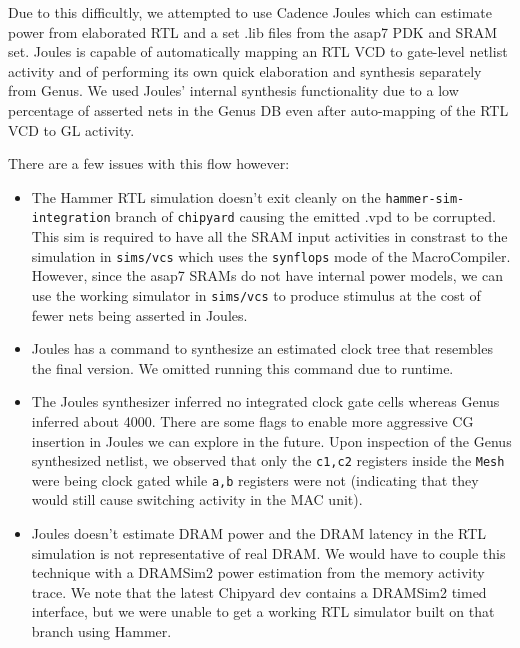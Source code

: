 \documentclass[sigconf]{acmart}
\begin{document}
Due to this difficultly, we attempted to use Cadence Joules which can estimate power from elaborated RTL and a set .lib files from the asap7 PDK and SRAM set.
Joules is capable of automatically mapping an RTL VCD to gate-level netlist activity and of performing its own quick elaboration and synthesis separately from Genus.
We used Joules' internal synthesis functionality due to a low percentage of asserted nets in the Genus DB even after auto-mapping of the RTL VCD to GL activity.

There are a few issues with this flow however:
\begin{itemize}
  \item The Hammer RTL simulation doesn't exit cleanly on the \texttt{hammer-sim-integration} branch of \texttt{chipyard} causing the emitted .vpd to be corrupted.
    This sim is required to have all the SRAM input activities in constrast to the simulation in \texttt{sims/vcs} which uses the \texttt{synflops} mode of the MacroCompiler.
    However, since the asap7 SRAMs do not have internal power models, we can use the working simulator in \texttt{sims/vcs} to produce stimulus at the cost of fewer nets being asserted in Joules.
  \item Joules has a command to synthesize an estimated clock tree that resembles the final version. We omitted running this command due to runtime.
  \item The Joules synthesizer inferred no integrated clock gate cells whereas Genus inferred about 4000. There are some flags to enable more aggressive CG insertion in Joules we can explore in the future. Upon inspection of the Genus synthesized netlist, we observed that only the \texttt{c1,c2} registers inside the \texttt{Mesh} were being clock gated while \texttt{a,b} registers were not (indicating that they would still cause switching activity in the MAC unit).
  \item Joules doesn't estimate DRAM power and the DRAM latency in the RTL simulation is not representative of real DRAM. We would have to couple this technique with a DRAMSim2 power estimation from the memory activity trace. We note that the latest Chipyard dev contains a DRAMSim2 timed interface, but we were unable to get a working RTL simulator built on that branch using Hammer.
\end{itemize}
\end{document}
